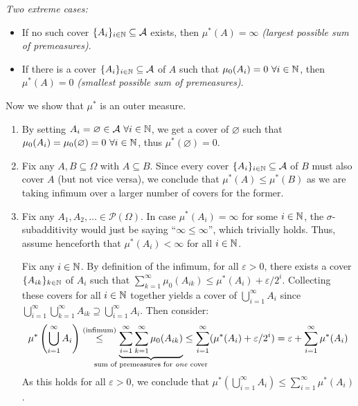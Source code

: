 \begin{enumerate}
\begin{pf}
\begin{center}
\end{center}
\emph{Two extreme cases:}
\begin{itemize}
\item If no such cover \(\{A_{i}\}_{i\in\mathbb{N}}\subseteq \mathcal{A}\) exists, then
\(\mu^*(A)=\infty\) \emph{(largest possible sum of premeasures)}.
\item If there is a cover \(\{A_{i}\}_{i\in\mathbb{N}}\subseteq \mathcal{A}\) of \(A\)
such that \(\mu_0(A_i)=0~\forall i\in\mathbb{N}\), then \(\mu^*(A)=0\) \emph{(smallest
possible sum of premeasures)}.
\end{itemize}
Now we show that \(\mu^*\) is an outer measure.
\begin{enumerate}[label={(\arabic*)}]
\item By setting \(A_i=\varnothing\in\mathcal{A}~\forall i\in\mathbb{N}\), we get a
cover of \(\varnothing\) such that \(\mu_0(A_i)=\mu_0(\varnothing)=0~\forall
i\in\mathbb{N}\), thus \(\mu^*(\varnothing)=0\).
\item Fix any \(A,B\subseteq \Omega\) with \(A\subseteq B\). Since every cover
\(\{A_{i}\}_{i\in\mathbb{N}}\subseteq \mathcal{A}\) of \(B\) must also cover \(A\) (but
not vice versa), we conclude that \(\mu^*(A)\le\mu^*(B)\) as we are
taking infimum over a larger number of covers for the former.
\item Fix any \(A_1,A_2,\dotsc\in\mathcal{P}(\Omega)\). In case
\(\mu^*(A_i)=\infty\) for some \(i\in\mathbb{N}\), the \(\sigma\)-subadditivity would
just be saying ``\(\infty\le\infty\)'', which trivially holds. Thus, assume
henceforth that \(\mu^*(A_i)<\infty\) for all \(i\in\mathbb{N}\).

Fix any \(i\in\mathbb{N}\). By definition of the infimum, for all \(\varepsilon>0\),
there exists a cover \(\{A_{ik}\}_{k\in\mathbb{N}}\) of \(A_i\) such that
\(\sum_{k=1}^{\infty}\mu_0(A_{ik})\le\mu^*(A_i)+\varepsilon/2^i\).  Collecting
these covers for all \(i\in\mathbb{N}\) together yields a cover of
\(\bigcup_{i=1}^{\infty}A_i\) since
\(\bigcup_{i=1}^{\infty}\bigcup_{k=1}^{\infty}A_{ik}\supseteq
\bigcup_{i=1}^{\infty}A_i\). Then consider:
\[
\mu^*\left(\bigcup_{i=1}^{\infty}A_i\right)
\overset{\text{(infimum)}}{\le}
\underbrace{\sum_{i=1}^{\infty}\sum_{k=1}^{\infty}\mu_0(A_{ik})}_{\mathclap{\text{sum
of premeasures for \emph{one} cover}}}
\le\sum_{i=1}^{\infty}(\mu^*(A_i)+\varepsilon/2^i)
=\varepsilon+\sum_{i=1}^{\infty}\mu^*(A_i)
\]
As this holds for all \(\varepsilon>0\), we conclude that
\(\mu^*(\bigcup_{i=1}^{\infty}A_i)\le\sum_{i=1}^{\infty}\mu^*(A_i)\).
\end{enumerate}


\end{pf}
\end{enumerate}
